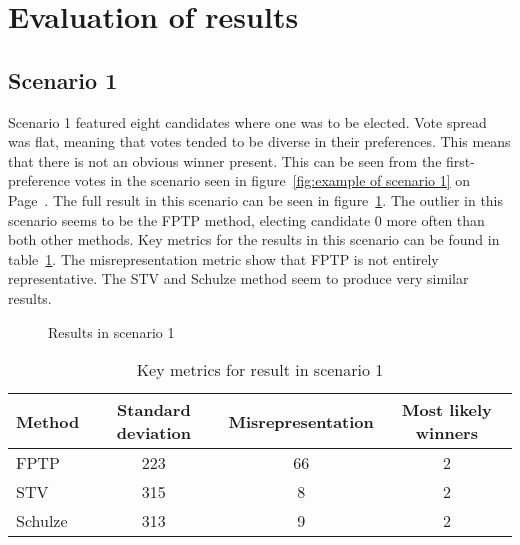 \documentclass[12pt]{article}
\begin{document}
\section{Evaluation of results}
\subsection{Scenario 1}
\label{sec:resuls-scenario1}
Scenario 1 featured eight candidates where one was to be elected. Vote spread was flat, meaning that votes tended to be diverse in their preferences. This means that there is not an obvious winner present. This can be seen from the first-preference votes in the scenario seen in figure~\ref{fig:example of scenario 1} on Page~\pageref{fig:example of scenario 1}. The full result in this scenario can be seen in figure~\ref{fig:scenario 1 results}. The outlier in this scenario seems to be the FPTP method, electing candidate 0 more often than both other methods. Key metrics for the results in this scenario can be found in table~\ref{tab:scenario 1 result}. The misrepresentation metric show that FPTP is not entirely representative. The STV and Schulze method seem to produce very similar results.
\begin{figure}[H]
	\centering
	\caption{Results in scenario 1}
\label{fig:scenario 1 results}
\end{figure}

\begin{table}[H]
\centering
\caption{Key metrics for result in scenario 1}
\label{tab:scenario 1 result}
\begin{tabular}{@{}lccc@{}}
\toprule
Method & Standard deviation & Misrepresentation & Most likely winners \\ \midrule
FPTP & 223 & 66 & 2 \\
STV & 315 & 8 & 2 \\
Schulze & 313 & 9 & 2 \\ \bottomrule
\end{tabular}
\end{table}
\end{document}

